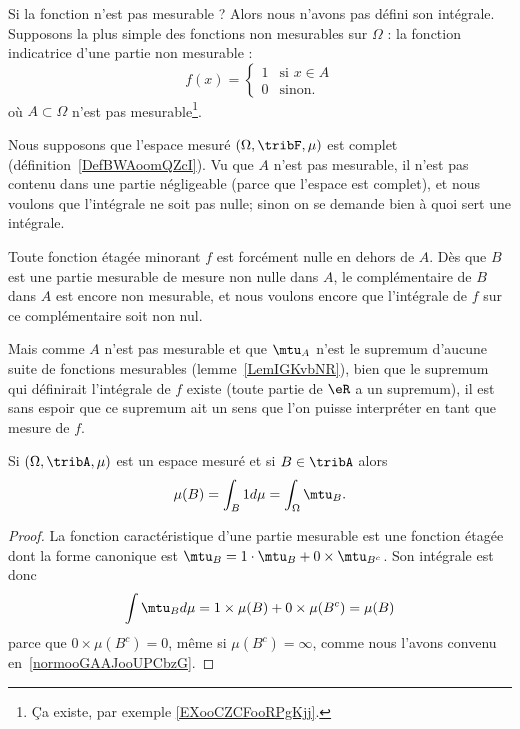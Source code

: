 \begin{normaltext}      \label{NORMooXTGBooKDnAhZ}
    Si la fonction n'est pas mesurable ? Alors nous n'avons pas défini son intégrale. Supposons la plus simple des fonctions non mesurables sur \( \Omega\) : la fonction indicatrice d'une partie non mesurable :
    \begin{equation}
        f(x)=\begin{cases}
            1    &   \text{si } x\in A\\
            0    &    \text{sinon. }
        \end{cases}
    \end{equation}
    où \( A\subset \Omega\) n'est pas mesurable\footnote{Ça existe, par exemple \ref{EXooCZCFooRPgKjj}.}.

    Nous supposons que l'espace mesuré \( (\Omega,\tribF,\mu)\) est complet (définition~\ref{DefBWAoomQZcI}). Vu que \( A\) n'est pas mesurable, il n'est pas contenu dans une partie négligeable (parce que l'espace est complet), et nous voulons que l'intégrale ne soit pas nulle; sinon on se demande bien à quoi sert une intégrale.

    Toute fonction étagée minorant \( f\) est forcément nulle en dehors de \( A\). Dès que \( B\) est une partie mesurable de mesure non nulle dans \( A\), le complémentaire de \( B\) dans \( A\) est encore non mesurable, et nous voulons encore que l'intégrale de \( f\) sur ce complémentaire soit non nul.

    Mais comme \( A\) n'est pas mesurable et que \( \mtu_A\) n'est le supremum d'aucune suite de fonctions mesurables (lemme~\ref{LemIGKvbNR}), bien que le supremum qui définirait l'intégrale de \( f\) existe (toute partie de \( \eR\) a un supremum), il est sans espoir que ce supremum ait un sens que l'on puisse interpréter en tant que mesure de \( f\).
\end{normaltext}

\begin{lemma}       \label{LemooPJLNooVKrBhN}
    Si \( (\Omega,\tribA,\mu)\) est un espace mesuré et si \( B\in \tribA\) alors
    \begin{equation}
        \mu(B)=\int_B1d\mu=\int_{\Omega}\mtu_B.
    \end{equation}
\end{lemma}

\begin{proof}
    La fonction caractéristique d'une partie mesurable est une fonction étagée dont la forme canonique est \( \mtu_B=1\cdot \mtu_B+0\times \mtu_{B^c}\). Son intégrale est donc
    \begin{equation}
        \int\mtu_Bd\mu=1\times \mu(B)+0\times \mu(B^c)=\mu(B)
    \end{equation}
    parce que \( 0\times \mu(B^c)=0\), même si \( \mu(B^c)=\infty\), comme nous l'avons convenu en~\ref{normooGAAJooUPCbzG}.
\end{proof}

